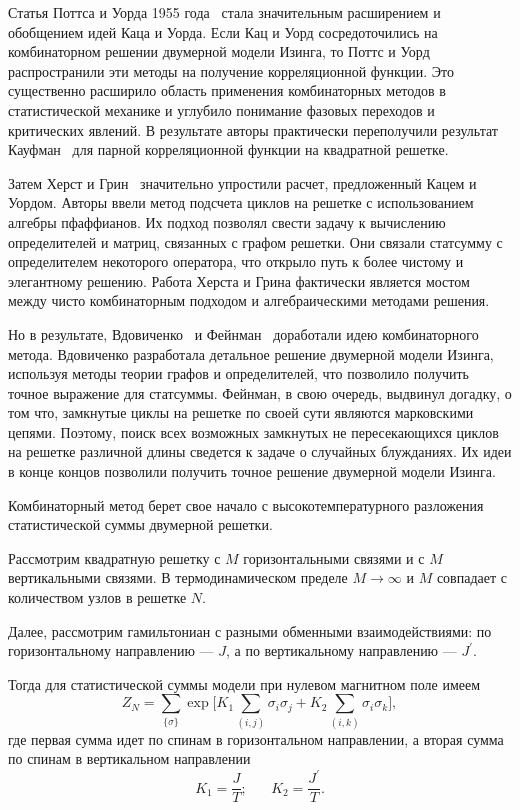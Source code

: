 Статья Поттса и Уорда 1955 года~\cite{potts1955} стала значительным расширением и обобщением идей Каца и Уорда. Если Кац и Уорд сосредоточились на комбинаторном решении двумерной модели Изинга, то Поттс и Уорд распространили эти методы на получение корреляционной функции. Это существенно расширило область применения комбинаторных методов в статистической механике и углубило понимание фазовых переходов и критических явлений. В результате авторы практически переполучили результат Кауфман~\cite{kaufman1949} для парной корреляционной функции на квадратной решетке.

Затем Херст и Грин~\cite{hurst1960} значительно упростили расчет, предложенный Кацем и Уордом. Авторы ввели метод подсчета циклов на решетке с использованием алгебры пфаффианов. Их подход позволял свести задачу к вычислению определителей и матриц, связанных с графом решетки. Они связали статсумму с определителем некоторого оператора, что открыло путь к более чистому и элегантному решению. Работа Херста и Грина фактически является мостом между чисто комбинаторным подходом и алгебраическими методами решения.

Но в результате, Вдовиченко~\cite{vdovichenko1965_1, vdovichenko1965_2} и Фейнман~\cite{feynmann1972} доработали идею комбинаторного метода. Вдовиченко разработала детальное решение двумерной модели Изинга, используя методы теории графов и определителей, что позволило получить точное выражение для статсуммы. Фейнман, в свою очередь, выдвинул догадку, о том что, замкнутые циклы на решетке по своей сути являются марковскими цепями. Поэтому, поиск всех возможных замкнутых не пересекающихся циклов на решетке различной длины сведется к задаче о случайных блужданиях. Их идеи в конце концов позволили получить точное решение двумерной модели Изинга.

Комбинаторный метод берет свое начало с высокотемпературного разложения статистической суммы двумерной решетки. 

Рассмотрим квадратную решетку с $M$ горизонтальными связями и с $M$ вертикальными связями. В термодинамическом пределе $M \rightarrow \infty$ и $M$ совпадает с количеством узлов в решетке $N$. 

Далее, рассмотрим гамильтониан с разными обменными взаимодействиями: по горизонтальному направлению --- $J$, а по вертикальному направлению --- $J^{'}$.

Тогда для статистической суммы модели при нулевом магнитном поле имеем
\begin{equation}
Z_{N} = \sum_{\{\sigma\}} \exp{\bigg[ K_1 \sum_{(i,j)} \sigma_i \sigma_j + K_2 \sum_{(i,k)} \sigma_i \sigma_k\bigg]},
\end{equation}
где первая сумма идет по спинам в горизонтальном направлении, а вторая сумма по спинам в вертикальном направлении
\begin{equation*}
K_1 = \frac{J}{T}; \;\;\;\;\;\; K_2 = \frac{J^{'}}{T}.
\end{equation*}

